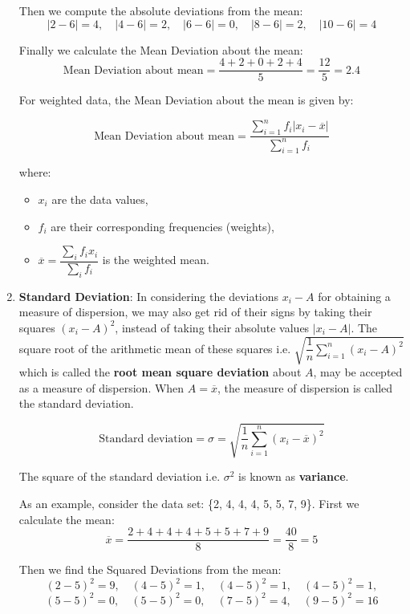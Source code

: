 \documentclass[twoside]{book}
\begin{document}
\begin{enumerate}
Then we compute the absolute deviations from the mean:
\[
|2 - 6| = 4,\quad |4 - 6| = 2,\quad |6 - 6| = 0,\quad |8 - 6| = 2,\quad |10 - 6| = 4
\]

Finally we calculate the Mean Deviation about the mean:
\[
\text{Mean Deviation about mean} = \frac{4 + 2 + 0 + 2 + 4}{5} = \frac{12}{5} = 2.4
\]

For weighted data, the Mean Deviation about the mean is given by:

\begin{textbox}
\[
\text{Mean Deviation about mean} = \frac{\sum_{i=1}^{n} f_i \left| x_i - \overline{x} \right|}{\sum_{i=1}^{n} f_i}
\]
\end{textbox}

where:
\begin{itemize}
    \item \( x_i \) are the data values,
    \item \( f_i \) are their corresponding frequencies (weights),
    \item \( \overline{x} = \dfrac{\sum_i f_i x_i}{\sum_i f_i} \) is the weighted mean.
\end{itemize}

    \item \textbf{Standard Deviation}: In considering the deviations $x_i-A$ for obtaining a measure of dispersion, we may also get rid of their signs by taking their squares $(x_i-A)^2$, instead of taking their absolute values $|x_i-A|$. The square root of the arithmetic mean of these squares i.e. $\sqrt{\dfrac{1}{n}\sum_{i=1}^n(x_i-A)^2}$ which is called the \textbf{root mean square deviation} about $A$, may be accepted as a measure of dispersion. When $A=\overline{x}$, the measure of dispersion is called the standard deviation.
    \begin{textbox}
    \[
    \text{Standard deviation} = \sigma = \sqrt{\frac{1}{n} \sum_{i=1}^{n} (x_i - \overline{x})^2}
    \]
    \end{textbox}
    The square of the standard deviation i.e. $\sigma^2$ is known as \textbf{variance}.

    As an example, consider the data set: \{2, 4, 4, 4, 5, 5, 7, 9\}. First we calculate the mean:
\[
\overline{x} = \frac{2 + 4 + 4 + 4 + 5 + 5 + 7 + 9}{8} = \frac{40}{8} = 5
\]

Then we find the Squared Deviations from the mean:
\[
(2 - 5)^2 = 9,\quad (4 - 5)^2 = 1,\quad (4 - 5)^2 = 1,\quad (4 - 5)^2 = 1,
\]
\[
(5 - 5)^2 = 0,\quad (5 - 5)^2 = 0,\quad (7 - 5)^2 = 4,\quad (9 - 5)^2 = 16
\]


\end{enumerate}
\end{document}
